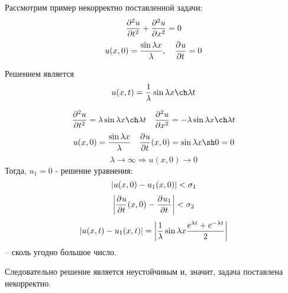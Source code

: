 Рассмотрим пример некорректно поставленной задачи:\\
\[
	\frac{\partial^{2}u}{\partial t^{2}} + \frac{\partial^{2}u}{\partial x^{2}} = 0
\]
\[
	u(x, 0) =  \frac{\sin \lambda x}{\lambda}, \quad \frac{\partial^{}u}{\partial t^{}} = 0
\]

Решением является
\[
	u(x, t) = \frac{1}{\lambda} \sin \lambda x \ch \lambda t
\]

\[
	\derp{u}{t}{2} = \lambda \sin \lambda x \ch \lambda t \quad \derp{u}{x}{2} = - \lambda \sin \lambda x \ch \lambda t
\]
\[
	u(x, 0) = \frac{\sin \lambda x}{\lambda} \quad \derp{u}{t}{} (x, 0) = \sin \lambda x\sh 0 = 0
\]
\[
	\lambda \to \infty \Rightarrow u(x, 0) \to 0
\]
Тогда, $u_1 = 0$ - решение уравнения:\\
\[
	\left | u(x, 0)- u_1(x,0) \right | < \sigma_1
\]
\[
	\left | \frac{\partial^{}u}{\partial t^{}} (x, 0) - \frac{\partial^{}u_1}{\partial t^{}} \right | < \sigma_2
\]
\[
	\left | u(x, t) - u_1(x, t) \right | = \left | \frac{1}{\lambda} \sin \lambda x \frac{e^{\lambda t} + e ^{- \lambda t}}{2} \right |
\]
-- сколь угодно большое число.

Следовательно решение является неустойчивым и, значит,  задача поставлена некорректно.